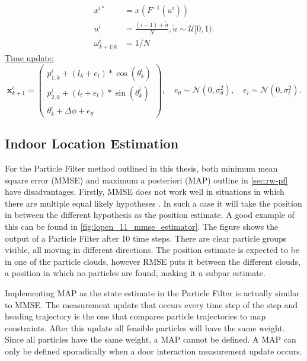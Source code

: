 \begin{algorithm}[]
{\begin{subequations}
{				\begin{align}
					x^{i*} &= x(F^{-1}(u^i)) \\
					u^i &= \frac{(i-1) + \tilde{u}}{N}, \tilde{u} \sim \mathcal{U}[0,1).\\
					\omega^i_{k+1|k} &= 1/N
				\end{align}
				
				\label{eq:pf_resampling}	
		}	\end{subequations}\smallskip
		\underline{Time update:}\\
		\begin{equation}
			\label{eq:algo_SHS_dynamic_model_with_noise}
			\mathbf{x}^i_{k + 1}
			=
			\left(\begin{array}{l}
				p_{1,k}^i + (l_{k} + e_l) * \cos (\theta_{k}^i) \\
				p_{2,k}^i + (l_{t} + e_l) * \sin (\theta_{k}^i) \\
				\theta_{k}^i + \Delta \phi + e_\theta 
			\end{array}\right), \quad
			e_{\theta} \sim \mathcal{N}\left(0, \sigma_{\theta}^{2}\right), \quad e_{l} \sim \mathcal{N}\left(0, \sigma_{l}^{2}\right).
		\end{equation}		
	}
\end{algorithm}
\restoregeometry
\newpage
\subsection{Indoor Location Estimation}
\label{sec:method-pf_location_estimate}
For the Particle Filter method outlined in this thesis, both minimum mean square error (MMSE) and maximum a posteriori (MAP) outline in \cref{sec:rw-pf} have disadvantages.
Firstly, MMSE does not work well in situations in which there are multiple equal likely hypotheses \cite{Saha2009}. In such a case it will take the position in between the different hypothesis as the position estimate. A good example of this can be found in \cref{fig:lopen_11_mmse_estimator}. The figure shows the output of a Particle Filter after 10 time steps. There are clear particle groups visible, all moving in different directions. The position estimate is expected to be in one of the particle clouds, however RMSE puts it between the different clouds, a position in which no particles are found, making it a subpar estimate. \par 
Implementing MAP as the state estimate in the Particle Filter is actually similar to MMSE. The measurement update that occurs every time step of the step and heading trajectory is the one that compares particle trajectories to map constraints. After this update all feasible particles will have the same weight. Since all particles have the same weight, a MAP cannot be defined. A MAP can only be defined sporadically when a door interaction measurement update occurs. 

